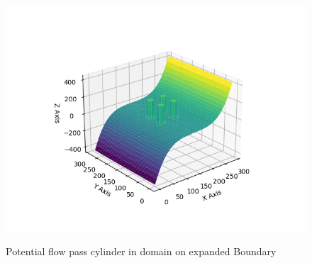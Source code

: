 \documentclass[12pt]{article}
\begin{document}
\begin{figure}[H]
    \centering
    \includegraphics[width=0.7  \textwidth]{Large_Domain3d.png}
    \label{Large_Domain3d.png}
    \caption{Potential flow pass cylinder in domain on expanded Boundary}                                                                                                                                                                                                                                                                                                                                                                                                                                                                                                                                                                                                                                                                                                                                                                                                                                                                                                                                                                                                                                                                                                                                                                                                                                                                                                                                                                                                                                                                                                                                                                                                                                                                                                                                                                                                                                                                                                                                                                                                                                                                                                                                                                                                                                                                                                                                                                                                                                                                             
\end{figure}
\end{document}
